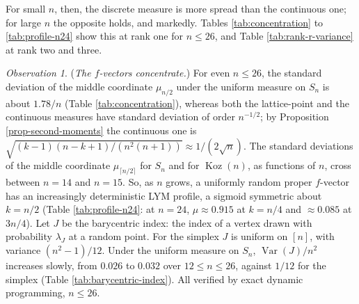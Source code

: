 \documentclass[11pt, a4paper, abstract=yes]{scrartcl}
\theoremstyle{definition}
\theoremstyle{remark}
\theoremstyle{plain}
\theoremstyle{remark}
\newtheorem{observation}[definition]{Observation}
\theoremstyle{plain}
\newcommand{\Koz}{\operatorname{Koz}}
\begin{document}
For small \(n\), then, the discrete measure is more spread than the continuous one; for large \(n\)
the opposite holds, and markedly. Tables \ref{tab:concentration} to \ref{tab:profile-n24} show this
at rank one for \(n\le26\), and Table \ref{tab:rank-r-variance} at rank two and three.

\begin{observation}
(\emph{The \(f\)-vectors concentrate.}) For even \(n\le26\), the standard deviation of the middle
coordinate \(\mu_{n/2}\) under the uniform measure on \(S_n\) is about \(1.78/n\) (Table
\ref{tab:concentration}), whereas both the lattice-point and the continuous measures have standard
deviation of order \(n^{-1/2}\); by Proposition \ref{prop-second-moments} the continuous one is
\(\sqrt{(k-1)(n-k+1)/(n^2(n+1))}\approx1/(2\sqrt n)\). The standard deviations of the middle coordinate
\(\mu_{\lceil n/2\rceil}\) for \(S_n\) and for \(\Koz(n)\), as functions of \(n\), cross between \(n=14\) and
\(n=15\). So, as \(n\) grows, a uniformly random proper \(f\)-vector has an increasingly
deterministic LYM profile, a sigmoid symmetric about \(k=n/2\) (Table \ref{tab:profile-n24}: at
\(n=24\), \(\mu\approx0.915\) at \(k=n/4\) and \(\approx0.085\) at \(3n/4\)). Let \(J\) be the barycentric
index: the index of a vertex drawn with probability \(\lambda_J\) at a random point. For the simplex
\(J\) is uniform on \([n]\), with variance \((n^2-1)/12\). Under the uniform measure on \(S_n\),
\(\operatorname{Var}(J)/n^2\) increases slowly, from \(0.026\) to \(0.032\) over \(12\le n\le26\),
against \(1/12\) for the simplex (Table \ref{tab:barycentric-index}). All verified by exact dynamic
programming, \(n\le26\).
\label{obs-concentration}
\end{observation}
\end{document}
